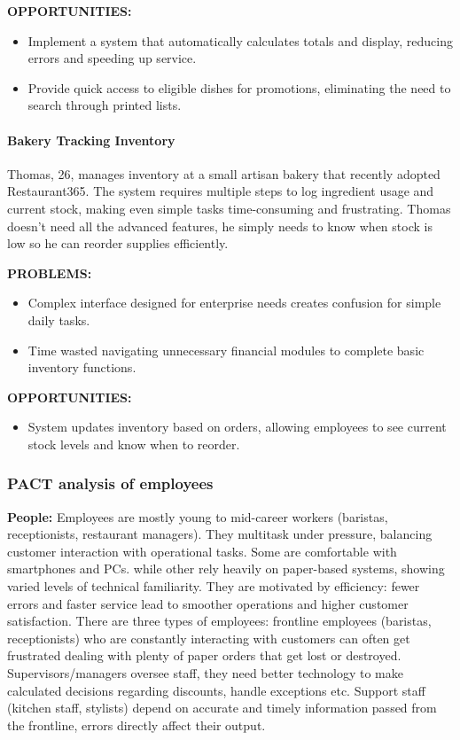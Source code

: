 \documentclass[]{VUMIFTemplateClass}
\newcommand{\subsubsubsection}[1]{\paragraph{#1}}
\begin{document}
\textbf{OPPORTUNITIES:}
\begin{itemize}
    \item Implement a system that automatically calculates totals and display, reducing errors and speeding up service.
    \item Provide quick access to eligible dishes for promotions, eliminating the need to search through printed lists.
\end{itemize}




\subsubsubsection{Bakery Tracking Inventory}
\label{subsubsubsec:bakery-inventory}

Thomas, 26, manages inventory at a small artisan bakery that recently adopted Restaurant365. The system requires multiple steps to log ingredient usage and current stock, making even simple tasks time-consuming and frustrating. Thomas doesn’t need all the advanced features, he simply needs to know when stock is low so he can reorder supplies efficiently.

\textbf{PROBLEMS:}
\begin{itemize}
    \item Complex interface designed for enterprise needs creates confusion for simple daily tasks.
    \item Time wasted navigating unnecessary financial modules to complete basic inventory functions.
\end{itemize}

\textbf{OPPORTUNITIES:}
\begin{itemize}
    \item System updates inventory based on orders, allowing employees to see current stock levels and know when to reorder.
\end{itemize}


\subsubsection{PACT analysis of employees}
    \textbf{People:} Employees are mostly young to mid-career workers (baristas, receptionists, restaurant managers). They multitask under pressure, balancing customer interaction with operational tasks. Some are comfortable with smartphones and PCs. while other rely heavily on paper-based systems, showing varied levels of technical familiarity. They are motivated by efficiency: fewer errors and faster service lead to smoother operations and higher customer satisfaction. There are three types of employees: frontline employees (baristas, receptionists) who are constantly interacting with customers can often get frustrated dealing with plenty of paper orders that get lost or destroyed. Supervisors/managers oversee staff, they need better technology to make calculated decisions regarding discounts, handle exceptions etc. Support staff (kitchen staff, stylists) depend on accurate and timely information passed from the frontline, errors directly affect their output.
    
\end{document}
